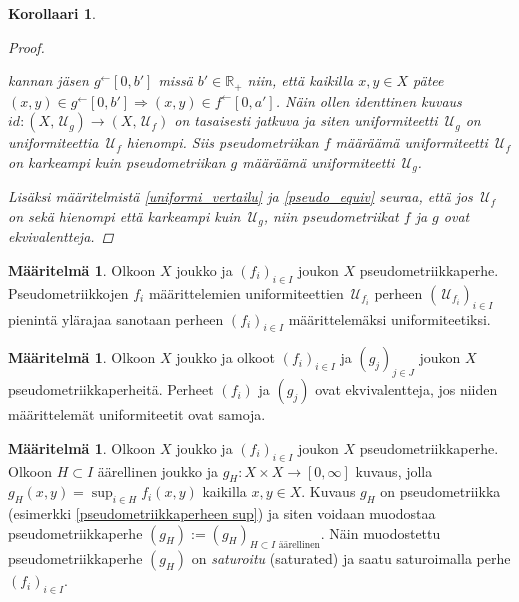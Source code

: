 \documentclass[12pt,a4paper,leqno]{report}
\newcommand{\R}{\mathbb{R}}
\newcommand{\U}{\,\mathcal{U}}
\theoremstyle{plain}
\newtheorem{kor}[equation]{Korollaari}
\theoremstyle{definition}
\newtheorem{maar}[equation]{Määritelmä}
\newtheorem{esim}[equation]{Esimerkki}
\theoremstyle{remark}
\begin{document}
\begin{kor}
\begin{proof}
\begin{enumerate}
kannan jäsen $g^{\leftarrow}[0,b']$ missä $b'\in\R_+$ niin, 
että kaikilla $x,y\in X$ pätee $(x,y)\in g^{\leftarrow}[0,b']\Rightarrow (x,y)\in f^{\leftarrow}[0,a']$. 
Näin ollen identtinen kuvaus $id\colon (X,\U_g)\rightarrow (X,\U_f)$ on 
tasaisesti jatkuva ja siten uniformiteetti $\U_g$ on uniformiteettia $\U_f$ hienompi. 
Siis pseudometriikan $f$ määräämä uniformiteetti 
$\U_f$ 
on karkeampi kuin pseudometriikan $g$ määräämä uniformiteetti $\U_g$.
\end{enumerate}
Lisäksi 
määritelmistä \ref{uniformi_vertailu} ja \ref{pseudo_equiv} seuraa, että jos $\U_f$ on sekä hienompi että karkeampi kuin $\U_g$, niin pseudometriikat $f$ ja $g$ ovat ekvivalentteja.
\end{proof}
\end{kor}
\begin{maar}
Olkoon $X$ joukko ja $(f_i)_{i\in I} $ joukon $X$ pseudometriikkaperhe. 
Pseudometriikkojen $f_i$ määrittelemien uniformiteettien $\U_{f_i}$ perheen $(\U_{f_i})_{i\in I}$ pienintä ylärajaa sanotaan perheen $(f_i)_{i\in I}$ määrittelemäksi uniformiteetiksi. 
\end{maar}
\begin{maar}
Olkoon $X$ joukko ja olkoot $(f_i)_{i\in I} $ ja $(g_j)_{j\in J} $ joukon $X$ pseudometriikkaperheitä. 
Perheet $(f_i)$ ja $(g_j) $ ovat ekvivalentteja, jos niiden määrittelemät uniformiteetit ovat samoja.
\end{maar}
\begin{maar}\label{saturoitu maar}
Olkoon $X$ joukko
ja $(f_i)_{i\in I} $ joukon $X$ pseudometriikkaperhe. 
Olkoon $H\subset I$ äärellinen joukko ja $g_{H}\colon X\times X\rightarrow [0,\infty]$ kuvaus, 
jolla $g_{H}(x,y)=\sup_{i\in H}f_i(x,y)$ kaikilla $x,y\in X$. 
Kuvaus $g_{H}$ on pseudometriikka 
(esimerkki \ref{pseudometriikkaperheen sup}) 
ja siten voidaan muodostaa pseudometriikkaperhe 
$(g_{H}):=(g_{H})_{H\subset I \text{ äärellinen}}$. 
Näin 
muodostettu pseudometriikkaperhe $(g_H)$ on
 \emph{saturoitu} (saturated) ja 
saatu saturoimalla perhe $(f_i)_{i\in I}$. 
\end{maar}
\end{document}
